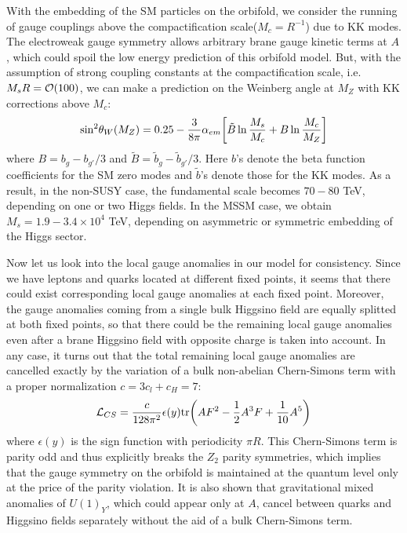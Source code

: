 \documentclass[a4paper,11pt]{article}
\begin{document}
With the embedding of the SM particles on the orbifold, 
we consider the running of gauge couplings above the
compactification scale($M_c=R^{-1}$) due to KK modes.
The electroweak gauge symmetry
allows arbitrary brane gauge kinetic terms at $A$, which could spoil the low
energy prediction of this orbifold model. But, with the assumption of strong
coupling constants at the compactification scale, i.e. $M_s R= {\cal O}(100)$,
we can make a prediction on the Weinberg angle at $M_Z$ with KK corrections
above $M_c$\cite{hall,kkl2}:
\begin{eqnarray}
{\rm sin}^2\theta_W(M_Z)=0.25-\frac{3}{8\pi}\alpha_{em}
\bigg[{\tilde B}\ln\frac{M_s}{M_c}+B\ln\frac{M_c}{M_Z}\bigg]
\end{eqnarray}
where $B=b_g-b_{g'}/3$ and ${\tilde B}={\tilde b}_g-{\tilde b}_{g'}/3$.
Here $b$'s denote the beta function coefficients for the SM zero modes 
and $\tilde b$'s denote those for the KK modes.
As a result, in the non-SUSY case, the fundamental scale
becomes $70-80$ TeV, depending on one or two Higgs fields.
In the MSSM case, we
obtain $M_s=1.9-3.4\times 10^4$ TeV, depending on asymmetric or symmetric
embedding of the Higgs sector.

Now let us look into the local gauge anomalies in our model
for consistency. Since we have leptons and quarks located at different fixed
points, it seems that there could exist corresponding local gauge anomalies
at each fixed point. Moreover, the gauge anomalies coming
from a single bulk Higgsino field are equally splitted at both fixed
points\cite{anomaly},
so that there could be the remaining local gauge anomalies even after a brane
Higgsino field with opposite charge is taken into account.
In any case, it turns out that the total remaining local gauge anomalies
are cancelled exactly by the variation of a bulk non-abelian Chern-Simons
term with a proper normalization $c=3c_l+c_H=7$:
\begin{eqnarray}
{\cal L}_{CS}=\frac{c}{128\pi^2}\epsilon(y){\rm tr}\bigg(AF^2-\frac{1}{2}A^3 F
+\frac{1}{10}A^5\bigg)
\end{eqnarray}
where $\epsilon(y)$ is the sign function with periodicity $\pi R$.
This Chern-Simons term is parity odd and thus explicitly breaks the
$Z_2$ parity symmetries, which implies that the gauge symmetry on the orbifold
is maintained at the quantum level only at the price of the parity violation.
It is also shown that gravitational mixed anomalies of $U(1)_Y$, which could
appear only at $A$, cancel between quarks and Higgsino fields separately
without the aid of a bulk Chern-Simons term\cite{kkl2}. 
\end{document}
